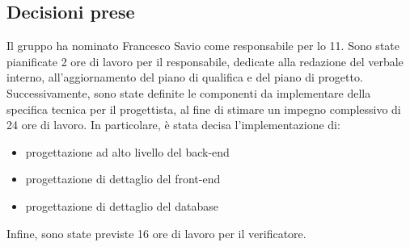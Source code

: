 \documentclass[a4paper, 12pt]{article}
\begin{document}
\subsection{Decisioni prese}
    Il gruppo ha nominato Francesco Savio come responsabile per lo  11.
    Sono state pianificate 2 ore di lavoro per il responsabile, dedicate alla redazione del verbale interno, all'aggiornamento del piano di qualifica e del piano di progetto.
    Successivamente, sono state definite le componenti da implementare della specifica tecnica per il progettista, al fine di stimare un impegno complessivo di 24 ore di lavoro.
    In particolare, è stata decisa l'implementazione di:
    \begin{itemize}
    \item progettazione ad alto livello del back-end
    \item progettazione di dettaglio del front-end    
    \item progettazione di dettaglio del database
    \end{itemize}
    Infine, sono state previste 16 ore di lavoro per il verificatore.
\end{document}

